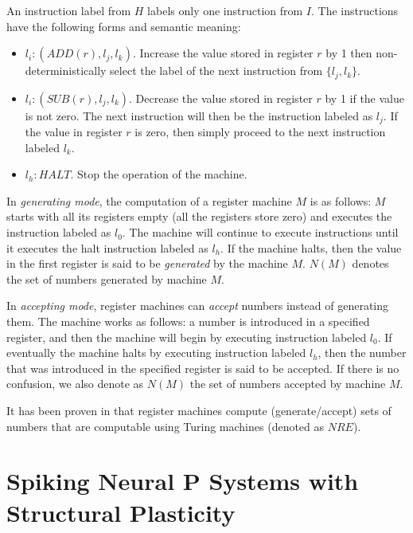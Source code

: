 \documentclass[runningheads,a4paper]{llncs}
\begin{document}
An instruction label from $H$ labels only one instruction from $I$. The instructions have the following forms and semantic meaning:

\begin{itemize}
   \item $l_i: (ADD(r),l_j,l_k)$. Increase the value stored in register $r$ by 1 then non-deterministically select the label of the next instruction
         from $\{l_j,l_k\}$.         
   \item $l_i: (SUB(r),l_j,l_k)$. Decrease the value stored in register $r$ by 1 if the value is not zero. The next instruction will then be the 
         instruction labeled as $l_j$. If the value in register $r$ is zero, then simply proceed to the next instruction labeled $l_k$.
   \item $l_h: HALT$. Stop the operation of the machine.
\end{itemize}
  
In \textit{generating mode}, the computation of a register machine $M$ is as follows: $M$ starts with all its registers empty (all the registers store
zero) and executes the instruction labeled as $l_0$. The machine will continue to execute instructions until it executes the halt instruction labeled
as $l_h$. If the machine halts, then the value in the first register is said to be \textit{generated} by the machine $M$. $N(M)$ denotes the set of 
numbers generated by machine $M$. 
  
In \textit{accepting mode}, register machines can \textit{accept} numbers instead of generating them. The machine works as follows: a number is 
introduced in a specified register, and then the machine will begin by executing instruction labeled $l_0$. If eventually the machine halts by 
executing instruction labeled $l_h$, then the number that was introduced in the specified register is said to be accepted. If there is no confusion, 
we also denote as $N(M)$ the set of numbers accepted by machine $M$.

It has been proven in \cite{MINSKY} that register machines compute (generate/accept) sets of numbers that are computable using Turing machines
(denoted as $NRE$). 
  

\section{Spiking Neural P Systems with Structural Plasticity}\label{sec-snpsp}
\end{document}
